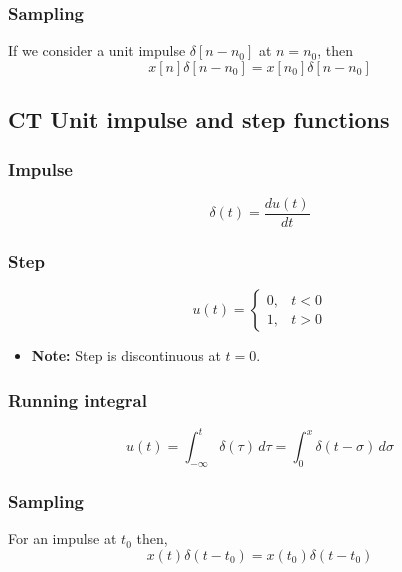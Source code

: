     \subsubsection{Sampling}
    \begin{definition}
        If we consider a unit impulse $\delta [n-n_0]$ at $n=n_0$, then
        \begin{equation}
            x[n] \delta[n - n_0] = x[n_0] \delta[n - n_0]
        \end{equation}
    \end{definition}

\subsection{CT Unit impulse and step functions}
    \subsubsection{Impulse}
    \begin{definition}
        \begin{equation}
            \delta(t) = \frac{du(t)}{dt}
        \end{equation}
    \end{definition}

    \subsubsection{Step}
    \begin{definition}
        \begin{equation}
            u(t) = 
            \begin{cases}
                0, & t < 0 \\
                1, & t > 0
            \end{cases}
        \end{equation}
        \begin{itemize}
            \item \textbf{Note:} Step is discontinuous at $t=0$.
        \end{itemize}
    \end{definition}

    \subsubsection{Running integral}
    \begin{definition}
        \begin{equation}
            u(t) = \int_{-\infty}^{t} \delta(\tau) \, d\tau = \int_{0}^{x} \delta(t - \sigma) \, d\sigma
        \end{equation}
    \end{definition}

    \subsubsection{Sampling}
    \begin{definition}
        For an impulse at $t_0$ then,
        \begin{equation}
            x(t) \delta(t - t_0) = x(t_0) \delta(t - t_0)
        \end{equation}
    \end{definition}

    